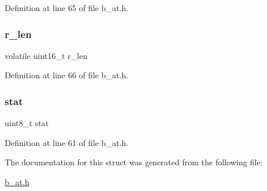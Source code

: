 Definition at line 65 of file b\+\_\+at.\+h.

\mbox{\label{structb_a_t___info__t_a9fadd39555572d9db701cd13e61d821f}} 
\subsubsection{\texorpdfstring{r\+\_\+len}{r\_len}}
{\footnotesize\ttfamily volatile uint16\+\_\+t r\+\_\+len}



Definition at line 66 of file b\+\_\+at.\+h.

\mbox{\label{structb_a_t___info__t_a3e0101ab4f197aedba71e5ed14c6bf20}} 
\subsubsection{\texorpdfstring{stat}{stat}}
{\footnotesize\ttfamily uint8\+\_\+t stat}



Definition at line 61 of file b\+\_\+at.\+h.



The documentation for this struct was generated from the following file\+:\begin{DoxyCompactItemize}
\item 
\mbox{\hyperlink{b__at_8h}{b\+\_\+at.\+h}}\end{DoxyCompactItemize}
